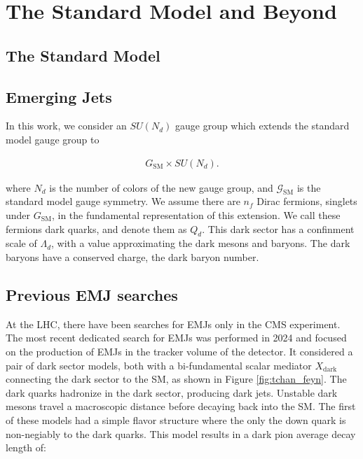\chapter{The Standard Model and Beyond}

\section{The Standard Model}

\section{Emerging Jets}

In this work, we consider an $SU(N_d)$ gauge group which extends the standard model gauge group to

\begin{equation}
	\begin{aligned}
		G_{\text{SM}} \times SU(N_d).
	\end{aligned}
\end{equation}

where $N_d$ is the number of colors of the new gauge group, and $\mathcal{G}_{\text{SM}}$ is the standard model gauge symmetry. We assume there are $n_f$ Dirac fermions, singlets under $G_{\text{SM}}$, in the fundamental representation of this extension. We call these fermions dark quarks, and denote them as $Q_d$. This dark sector has a confinment scale of $\Lambda_d$, with a value approximating the dark mesons and baryons. The dark baryons have a conserved charge, the dark baryon number.

\section{Previous EMJ searches}

At the LHC, there have been searches for EMJs only in the CMS experiment. The most recent dedicated search for EMJs \cite{cmscollaborationSearchNewPhysics2024} was performed in 2024 and focused on the production of EMJs in the tracker volume of the detector. It considered a pair of dark sector models, both with a bi-fundamental scalar mediator $X_{\text{dark}}$ connecting the dark sector to the SM, as shown in Figure \ref{fig:tchan_feyn}. The dark quarks hadronize in the dark sector, producing dark jets. Unstable dark mesons travel a macroscopic distance before decaying back into the SM. The first of these models had a simple flavor structure where the only the down quark is non-negiably to the dark quarks. This model results in a dark pion average decay length of:


